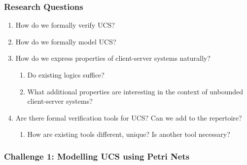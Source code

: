 \documentclass [serif,professionalfont]{beamer}
\begin{document}
\begin{frame}\frametitle{Research Questions}
    \begin{enumerate}
        \item How do we formally verify UCS?

        \item How do we formally model UCS?


        \item How do we express properties of client-server systems naturally?
              \begin{enumerate}
                  \item Do existing logics suffice?
                  \item What additional properties are interesting in the context of unbounded client-server systems?
              \end{enumerate}\pause

        \item Are there formal verification tools for UCS? Can we add to the repertoire?
              \begin{enumerate}
                  \item How are existing tools different, unique? Is another tool necessary?
              \end{enumerate}
    \end{enumerate}
\end{frame}


\begin{frame}
    \frametitle{\small{Challenge 1: Modelling UCS \colorbox{green!30}{using Petri Nets}}}
    \begin{figure}[!ht]
        \begin{center}
            
        \end{center}
    \end{figure}
\end{frame}
\end{document}

